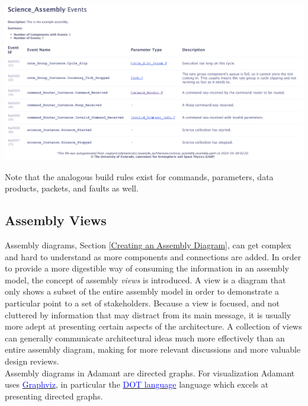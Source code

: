 \vspace{5mm} %
\includegraphics[width=\textwidth]{images/assemblyeventshtml.png}
\vspace{5mm} %

Note that the analogous build rules exist for commands, parameters, data products, packets, and faults as well.

\subsection{Assembly Views} \label{Assembly Views}

Assembly diagrams, Section \ref{Creating an Assembly Diagram}, can get complex and hard to understand as more components and connections are added. In order to provide a more digestible way of consuming the information in an assembly model, the concept of assembly \textit{views} is introduced. A view is a diagram that only shows a subset of the entire assembly model in order to demonstrate a particular point to a set of stakeholders. Because a view is focused, and not cluttered by information that may distract from its main message, it is usually more adept at presenting certain aspects of the architecture. A collection of views can generally communicate architectural ideas much more effectively than an entire assembly diagram, making for more relevant discussions and more valuable design reviews. \\

Assembly diagrams in Adamant are directed graphs. For visualization Adamant uses \href{https://www.graphviz.org/}{\textcolor{blue}{Graphviz}}, in particular the \href{https://graphviz.gitlab.io/_pages/doc/info/lang.html}{\textcolor{blue}{DOT language}} language which excels at presenting directed graphs. \\

